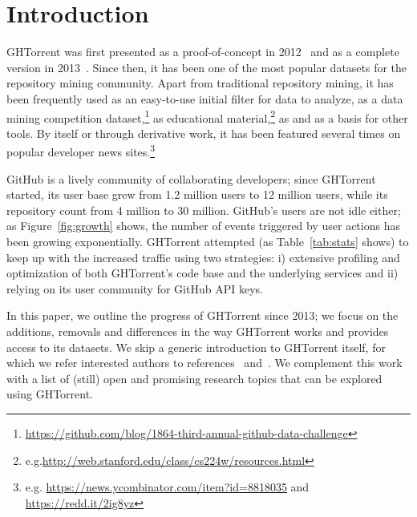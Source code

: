 \documentclass{sig-alternate}
\begin{document}

%
%
\printccsdesc


\section{Introduction}

GHTorrent was first presented as a proof-of-concept in 2012~\cite{GS12} and as
a complete version in 2013~\cite{Gousi13}. Since then, it has been one of the most
popular datasets for the repository mining community. Apart from traditional
repository mining, it has been frequently used as an easy-to-use initial
filter for data to analyze, as a data mining competition
dataset,\footnote{\url{https://github.com/blog/1864-third-annual-github-data-challenge}}
as educational material,\footnote{e.g.\url{http://web.stanford.edu/class/cs224w/resources.html}} as and as a basis for other tools\cite{Cosent15}.
By itself or through derivative work, it has been featured several times
on popular developer news sites.\footnote{e.g. \url{https://news.ycombinator.com/item?id=8818035} and\\ \url{https://redd.it/2ig8yz}}

GitHub is a lively community of collaborating developers; since GHTorrent
started, its user base grew from 1.2 million users to 12 million users, while
its repository count from 4 million to 30 million. GitHub's users are not idle
either; as Figure~\ref{fig:growth} shows, the number of events triggered by user
actions has been growing exponentially. GHTorrent attempted (as
Table~\ref{tab:stats} shows) to keep up with the increased traffic using two
strategies: i) extensive profiling and optimization of both GHTorrent's code
base and the underlying services and ii) relying on its user community for
GitHub API keys.

In this paper, we outline the progress of GHTorrent since 2013; we focus on the
additions, removals and differences in the way GHTorrent works and provides
access to its datasets. We skip a generic introduction to GHTorrent itself, for
which we refer interested authors to references~\cite{GS12} and~\cite{Gousi13}.
We complement this work with a list of (still) open and promising research
topics that can be explored using GHTorrent.
\end{document}
